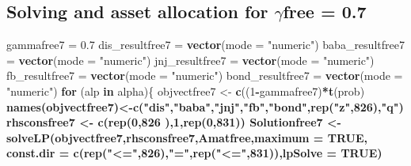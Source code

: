 \documentclass[]{article}
\newenvironment{Shaded}{\begin{snugshade}}{\end{snugshade}}
\newcommand{\KeywordTok}[1]{\textcolor[rgb]{0.13,0.29,0.53}{\textbf{#1}}}
\newcommand{\DataTypeTok}[1]{\textcolor[rgb]{0.13,0.29,0.53}{#1}}
\newcommand{\DecValTok}[1]{\textcolor[rgb]{0.00,0.00,0.81}{#1}}
\newcommand{\FloatTok}[1]{\textcolor[rgb]{0.00,0.00,0.81}{#1}}
\newcommand{\StringTok}[1]{\textcolor[rgb]{0.31,0.60,0.02}{#1}}
\newcommand{\OtherTok}[1]{\textcolor[rgb]{0.56,0.35,0.01}{#1}}
\newcommand{\ControlFlowTok}[1]{\textcolor[rgb]{0.13,0.29,0.53}{\textbf{#1}}}
\newcommand{\OperatorTok}[1]{\textcolor[rgb]{0.81,0.36,0.00}{\textbf{#1}}}
\newcommand{\NormalTok}[1]{#1}
\begin{document}
\subsection{\texorpdfstring{Solving and asset allocation for
\(\gamma\)free =
0.7}{Solving and asset allocation for \textbackslash{}gammafree = 0.7}}\label{solving-and-asset-allocation-for-gammafree-0.7}

\begin{Shaded}
\begin{Highlighting}[]
\NormalTok{gammafree7 =}\StringTok{ }\FloatTok{0.7}
\NormalTok{dis_resultfree7 =}\StringTok{ }\KeywordTok{vector}\NormalTok{(}\DataTypeTok{mode =} \StringTok{"numeric"}\NormalTok{)}
\NormalTok{baba_resultfree7 =}\StringTok{ }\KeywordTok{vector}\NormalTok{(}\DataTypeTok{mode =} \StringTok{"numeric"}\NormalTok{)}
\NormalTok{jnj_resultfree7 =}\StringTok{ }\KeywordTok{vector}\NormalTok{(}\DataTypeTok{mode =} \StringTok{"numeric"}\NormalTok{)}
\NormalTok{fb_resultfree7 =}\StringTok{ }\KeywordTok{vector}\NormalTok{(}\DataTypeTok{mode =} \StringTok{"numeric"}\NormalTok{)}
\NormalTok{bond_resultfree7 =}\StringTok{ }\KeywordTok{vector}\NormalTok{(}\DataTypeTok{mode =} \StringTok{"numeric"}\NormalTok{)}
\ControlFlowTok{for}\NormalTok{ (alp }\ControlFlowTok{in}\NormalTok{ alpha)\{}
\NormalTok{  objvectfree7 <-}\StringTok{ }\KeywordTok{c}\NormalTok{((}\DecValTok{1}\OperatorTok{-}\NormalTok{gammafree7)}\OperatorTok{*}\KeywordTok{t}\NormalTok{(prob)}\OperatorTok{%
  \KeywordTok{names}\NormalTok{(objvectfree7)<-}\KeywordTok{c}\NormalTok{(}\StringTok{"dis"}\NormalTok{,}\StringTok{"baba"}\NormalTok{,}\StringTok{"jnj"}\NormalTok{,}\StringTok{"fb"}\NormalTok{,}\StringTok{"bond"}\NormalTok{,}\KeywordTok{rep}\NormalTok{(}\StringTok{"z"}\NormalTok{,}\DecValTok{826}\NormalTok{),}\StringTok{"q"}\NormalTok{) }
\NormalTok{  rhsconsfree7 <-}\StringTok{ }\KeywordTok{c}\NormalTok{(}\KeywordTok{rep}\NormalTok{(}\DecValTok{0}\NormalTok{,}\DecValTok{826}\NormalTok{ ),}\DecValTok{1}\NormalTok{,}\KeywordTok{rep}\NormalTok{(}\DecValTok{0}\NormalTok{,}\DecValTok{831}\NormalTok{))}
\NormalTok{  Solutionfree7 <-}\StringTok{ }\KeywordTok{solveLP}\NormalTok{(objvectfree7,rhsconsfree7,Amatfree,}\DataTypeTok{maximum =} \OtherTok{TRUE}\NormalTok{,}
          \DataTypeTok{const.dir =} \KeywordTok{c}\NormalTok{(}\KeywordTok{rep}\NormalTok{(}\StringTok{"<="}\NormalTok{,}\DecValTok{826}\NormalTok{),}\StringTok{"="}\NormalTok{,}\KeywordTok{rep}\NormalTok{(}\StringTok{"<="}\NormalTok{,}\DecValTok{831}\NormalTok{)),}\DataTypeTok{lpSolve =} \OtherTok{TRUE}\NormalTok{)}
}
\end{Highlighting}
\end{Shaded}
\end{document}

